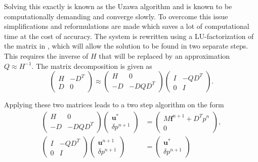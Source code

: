 Solving this exactly is known as the Uzawa algorithm and is known to be 
computationally demanding and converge slowly. To overcome this issue
simplifications and reformulations are made which saves a lot of computational time 
at the cost of accuracy.
The system is rewritten using a LU-factorization of the matrix in , 
which will allow the solution to be found in two separate steps. This 
requires the inverse of $H$ that will be replaced by an approximation $Q\approx H^{-1}$.
The matrix decomposition is given as
%
\begin{equation}
\begin{pmatrix}
    H & -D^T \\ 
    D & 0
\end{pmatrix}
\approx
\begin{pmatrix}
    H & 0 \\ 
    -D & -DQD^{T}
\end{pmatrix}
\begin{pmatrix}
    I & -QD^T \\ 
    0 & I
\end{pmatrix}.
    \label{eq:LUfactorization}
\end{equation}
%

Applying these two matrices leads to a two step algorithm on the form 
\begin{align}
\begin{pmatrix}
    H & 0 \\ 
    -D & -DQD^{T}
\end{pmatrix}
\begin{pmatrix}
    \mathbf{u}^{*}  \\ 
    \delta p^{n+1} 
\end{pmatrix}
&=
\begin{pmatrix}
    M\mathbf{f}^{n+1} +D^Tp^n  \\ 
    0 
    \end{pmatrix}
    \label{eq:PCstep1}
    ,\\
\begin{pmatrix}
    I & -QD^T \\ 
    0 & I
\end{pmatrix}
\begin{pmatrix}
    \mathbf{u}^{n+1}  \\ 
    \delta p^{n+1} 
\end{pmatrix}
&=
\begin{pmatrix}
    \mathbf{u}^{*}  \\ 
    \delta p^{n+1} 
\end{pmatrix}
    \label{eq:PCstep2}
\end{align}


